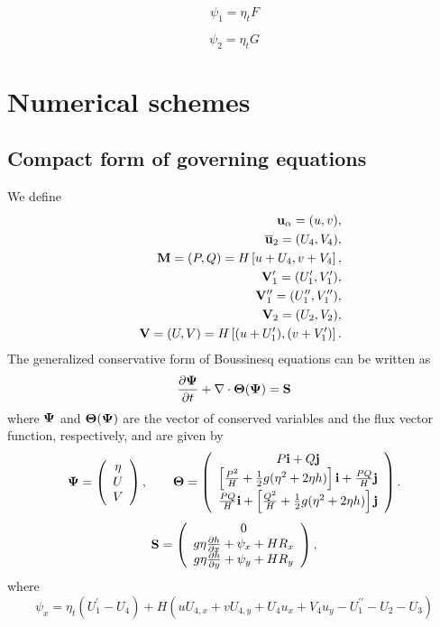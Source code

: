 \documentclass[11pt]{article}
\newcommand{\be}{\begin{equation}}
\newcommand{\ee}{\end{equation}}
\newcommand{\ba}{\begin{eqnarray}}
\newcommand{\ea}{\end{eqnarray}}
\newcommand{\utwo}{\overline{\bf u}_2}
\begin{document}
\be
\psi_1=\eta_t F
\ee

\be
\psi_2  = \eta_t G
\ee


\section{Numerical schemes}

\subsection{Compact form of governing equations}

We define
\ba
\nonumber
&& {\bf u}_\alpha = (u, v) ,\\
\nonumber 
&& \utwo = (U_4, V_4), \\
\nonumber
&& {\bf M} = (P, Q)  = H  \left[ u + U_4, v + V_4 \right],\\
\nonumber
&& {\bf V}_1^{\prime} = (U_1^{\prime}, V_1^{\prime}) , \\
\nonumber
&& {\bf V}_1^{\prime \prime} = (U_1^{\prime \prime}, V_1^{\prime \prime})  ,\\
\nonumber
&&  {\bf V}_2 = (U_2, V_2) , \\
\nonumber
&& {\bf V} = (U,V) = H \left[  (u +  U_1^{\prime}),  (v +  V_1^{\prime}) \right] .
\ea
The generalized conservative form of Boussinesq equations can be written as
\be
\frac{\partial {\bf \Psi}}{\partial t} + \nabla \cdot {\bf \Theta}({\bf \Psi}) = {\bf S}
\label{tvd}
\ee
where ${\bf \Psi}$ and ${\bf \Theta} ({\bf \Psi})$ are  the vector of conserved variables and  the flux vector function, respectively, and are given by
\ba
{\bf \Psi} = \left( \begin{array}{c} \eta \\
U \\
V \end{array} \right) ,
\ \ \ \  \ \  {\bf \Theta} = \left( \begin{array}{c}
P {\bf i} + Q {\bf j} \\
\left[\frac{P^2}{H} +\frac{1}{2}g (\eta^2 + 2 \eta h) \right ] {\bf i} + \frac{P Q}{H} {\bf j} \\
\frac{P Q}{H} {\bf i} + \left[\frac{Q^2}{H} +\frac{1}{2} g (\eta^2 + 2\eta h) \right] {\bf j} 
\end{array}
\right) .
\ea
\ba
{\bf S} = \left( \begin{array}{c} 
0\\
g \eta \frac{\partial h}{\partial x}  +\psi_x + H R_x  \\
g \eta \frac{\partial h}{\partial y} + \psi_y + H R_y
\end{array}
\right) ,
\ea
where 
\be 
\psi_x =  \eta_t (U_1^{\prime}-U_4) + H \left( u U_{4,x} + v U_{4,y} + U_4 u_x +V_4 u_y  - U_1^{\prime \prime}-  U_2 -  U_3 \right) 
\ee
\end{document}
